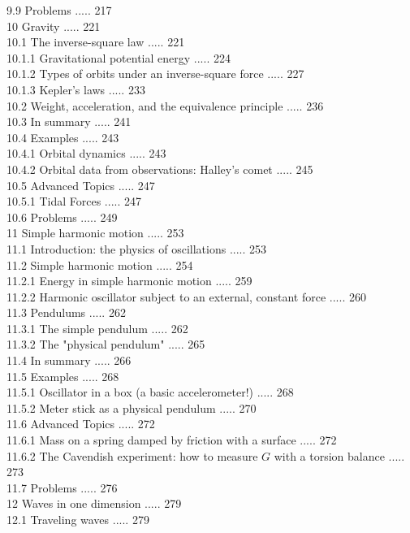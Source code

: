 \documentclass[10pt]{article}
\begin{document}
9.9 Problems ..... 217\\
10 Gravity ..... 221\\
10.1 The inverse-square law ..... 221\\
10.1.1 Gravitational potential energy ..... 224\\
10.1.2 Types of orbits under an inverse-square force ..... 227\\
10.1.3 Kepler's laws ..... 233\\
10.2 Weight, acceleration, and the equivalence principle ..... 236\\
10.3 In summary ..... 241\\
10.4 Examples ..... 243\\
10.4.1 Orbital dynamics ..... 243\\
10.4.2 Orbital data from observations: Halley's comet ..... 245\\
10.5 Advanced Topics ..... 247\\
10.5.1 Tidal Forces ..... 247\\
10.6 Problems ..... 249\\
11 Simple harmonic motion ..... 253\\
11.1 Introduction: the physics of oscillations ..... 253\\
11.2 Simple harmonic motion ..... 254\\
11.2.1 Energy in simple harmonic motion ..... 259\\
11.2.2 Harmonic oscillator subject to an external, constant force ..... 260\\
11.3 Pendulums ..... 262\\
11.3.1 The simple pendulum ..... 262\\
11.3.2 The "physical pendulum" ..... 265\\
11.4 In summary ..... 266\\
11.5 Examples ..... 268\\
11.5.1 Oscillator in a box (a basic accelerometer!) ..... 268\\
11.5.2 Meter stick as a physical pendulum ..... 270\\
11.6 Advanced Topics ..... 272\\
11.6.1 Mass on a spring damped by friction with a surface ..... 272\\
11.6.2 The Cavendish experiment: how to measure $G$ with a torsion balance ..... 273\\
11.7 Problems ..... 276\\
12 Waves in one dimension ..... 279\\
12.1 Traveling waves ..... 279\\
\end{document}

